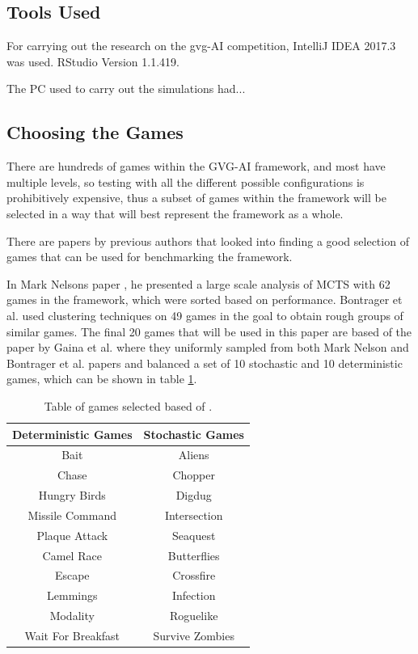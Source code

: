 \documentclass[journal]{IEEEtran}
\begin{document}
	\subsection{Tools Used}
	For carrying out the research on the gvg-AI competition, IntelliJ IDEA 2017.3 was used. RStudio Version 1.1.419.
	
	The PC used to carry out the simulations had... %

	\subsection{Choosing the Games}
	
	There are hundreds of games within the GVG-AI framework, and most have multiple levels, so testing with all the different possible configurations is prohibitively expensive, thus a subset of games within the framework will be selected in a way that will best represent the framework as a whole.
	
	There are papers by previous authors that looked into finding a good selection of games that can be used for benchmarking the framework. \cite{gaina2017population}
	
	In Mark Nelsons paper \cite{nelson2016investigating}, he presented a large scale analysis of MCTS with 62 games in the framework, which were sorted based on performance. Bontrager et al. \cite{bontrager2016matching} used clustering techniques on 49 games in the goal to obtain rough groups of similar games.
	The final 20 games that will be used in this paper are based of the paper by Gaina et al. \cite{gaina2017population} where they uniformly sampled from both Mark Nelson and Bontrager et al. papers and balanced a set of 10 stochastic and 10 deterministic games, which can be shown in table \ref{GamesTable}.
	
	
	\begin{table}[h!]
	\centering
	\begin{tabular} { |c||c|} 
		 \hline
		 \bf{Deterministic Games} & \bf{Stochastic Games} \\
		 \hline
		 Bait & Aliens  \\
 		Chase  & Chopper   \\
		Hungry Birds  & Digdug   \\
		Missile Command  & Intersection   \\
		Plaque Attack  & Seaquest   \\
		Camel Race  & Butterflies   \\
		Escape  & Crossfire   \\
		Lemmings  & Infection   \\
		Modality  & Roguelike   \\
		Wait For Breakfast  & Survive Zombies   \\
		\hline
	\end{tabular}
	\caption{Table of games selected based of \cite{guerrero2017beyond, gaina2017population}.}
	\label{GamesTable}
	\end{table}
	
\end{document}
